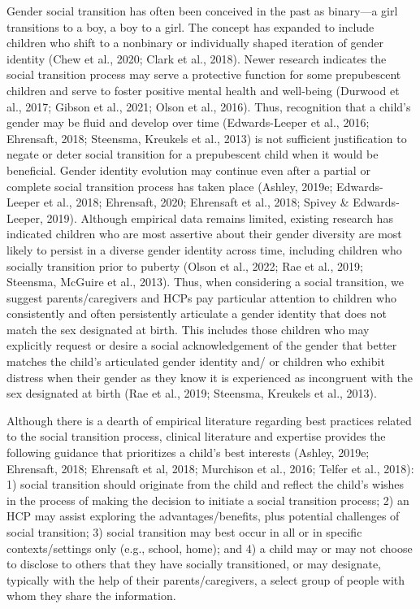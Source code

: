 \documentclass[
]{book}
\begin{document}
Gender social transition has often been conceived in the past as binary---a girl transitions to
a boy, a boy to a girl. The concept has expanded
to include children who shift to a nonbinary or
individually shaped iteration of gender identity
(Chew et al., 2020; Clark et al., 2018). Newer
research indicates the social transition process may
serve a protective function for some prepubescent
children and serve to foster positive mental health
and well-being (Durwood et al., 2017; Gibson
et al., 2021; Olson et al., 2016). Thus, recognition
that a child's gender may be fluid and develop
over time (Edwards-Leeper et al., 2016; Ehrensaft,
2018; Steensma, Kreukels et al., 2013) is not sufficient justification to negate or deter social transition for a prepubescent child when it would be
beneficial. Gender identity evolution may continue
even after a partial or complete social transition
process has taken place (Ashley, 2019e;
Edwards-Leeper et al., 2018; Ehrensaft, 2020;
Ehrensaft et al., 2018; Spivey \& Edwards-Leeper,
2019). Although empirical data remains limited,
existing research has indicated children who are
most assertive about their gender diversity are
most likely to persist in a diverse gender identity
across time, including children who socially transition prior to puberty (Olson et al., 2022; Rae
et al., 2019; Steensma, McGuire et al., 2013). Thus,
when considering a social transition, we suggest
parents/caregivers and HCPs pay particular attention to children who consistently and often persistently articulate a gender identity that does not
match the sex designated at birth. This includes
those children who may explicitly request or desire
a social acknowledgement of the gender that better
matches the child's articulated gender identity and/
or children who exhibit distress when their gender
as they know it is experienced as incongruent with
the sex designated at birth (Rae et al., 2019;
Steensma, Kreukels et al., 2013).

Although there is a dearth of empirical literature regarding best practices related to the social
transition process, clinical literature and expertise
provides the following guidance that prioritizes
a child's best interests (Ashley, 2019e; Ehrensaft,
2018; Ehrensaft et al, 2018; Murchison et al.,
2016; Telfer et al., 2018): 1) social transition
should originate from the child and reflect the
child's wishes in the process of making the
decision to initiate a social transition process; 2)
an HCP may assist exploring the advantages/benefits, plus potential challenges of social transition;
3) social transition may best occur in all or in
specific contexts/settings only (e.g., school, home);
and 4) a child may or may not choose to disclose
to others that they have socially transitioned, or
may designate, typically with the help of their
parents/caregivers, a select group of people with
whom they share the information.
\end{document}
